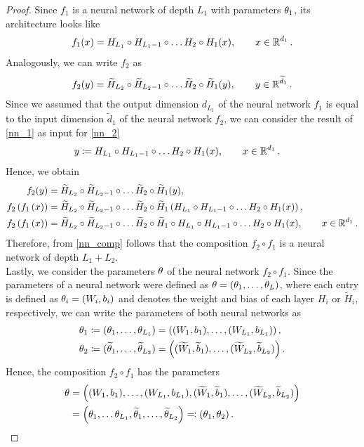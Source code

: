 \begin{proof}
Since $f_1$ is a neural network of depth $L_1$ with parameters $\theta_1$, its architecture looks like
\begin{align}\label{nn_1}
f_1 (x) = H_{L_1} \circ H_{L_1-1} \circ \ldots H_{2} \circ H_1 (x),\qquad x \in \operatorname{\mathbb{R}}^{d_1}.
\end{align}
Analogously, we can write $f_2$ as
\begin{align}\label{nn_2}
f_2 (y) = \widetilde{H}_{L_2} \circ \widetilde{H}_{L_2-1} \circ \ldots \widetilde{H}_{2} \circ \widetilde{H}_1 (y), \qquad y \in \operatorname{\mathbb{R}}^{\widetilde{d}_1}.
\end{align}
Since we assumed that the output dimension $d_{L_1}$ of the neural network $f_1$ is equal to the input dimension $\tilde{d}_1$ of the neural network $f_2$, we can consider the result of \eqref{nn_1} as input for \eqref{nn_2}
\begin{align*}
y &\coloneqq H_{L_1} \circ H_{L_1-1} \circ \ldots H_{2} \circ H_1 (x), \qquad x \in \operatorname{\mathbb{R}}^{d_1}.
\end{align*}
Hence, we obtain
\begin{align}\label{nn_comp}
f_2 (y) &= \widetilde{H}_{L_2} \circ \widetilde{H}_{L_2-1} \circ \ldots \widetilde{H}_{2} \circ \widetilde{H}_1 (y),\nonumber\\
f_2\left(f_1\left(x\right)\right)  &= \widetilde{H}_{L_2} \circ \widetilde{H}_{L_2-1} \circ \ldots \widetilde{H}_{2} \circ \widetilde{H}_1 \left( H_{L_1} \circ H_{L_1-1} \circ \ldots H_{2} \circ H_1 (x) \right),\nonumber\\
f_2\left(f_1\left(x\right)\right)  &= \widetilde{H}_{L_2} \circ \widetilde{H}_{L_2-1} \circ \ldots \widetilde{H}_{2} \circ \widetilde{H}_1 \circ H_{L_1} \circ H_{L_1-1} \circ \ldots H_{2} \circ H_1 (x), \qquad x \in \operatorname{\mathbb{R}}^{d_1}.
\end{align}
Therefore, from \eqref{nn_comp} follows that the composition $f_2 \circ f_1$ is a neural network of depth $L_1 + L_2$.\\
Lastly, we consider the parameters $\theta$ of the neural network $f_2 \circ f_1$. Since the parameters of a neural network were defined as $\theta = (\theta_1,\ldots, \theta_L)$, where each entry is defined as $\theta_i = (W_i, b_i)$ and denotes the weight and bias of each layer $H_i$ or $\tilde{H}_i$, respectively, we can write the parameters of both neural networks as
\begin{align*}
\theta_1 &\coloneqq (\theta_1, \ldots, \theta_{L_1}) = \left((W_1, b_1),\ldots, (W_{L_1}, b_{L_1}) \right),\\
\theta_2 &\coloneqq (\widetilde{\theta}_1, \ldots, \widetilde{\theta}_{L_2}) = \left((\widetilde{W}_1, \widetilde{b}_1),\ldots, (\widetilde{W}_{L_2}, \widetilde{b}_{L_2}) \right).
\end{align*}
Hence, the composition $f_2\circ f_1$ has the parameters
\begin{align*}
\theta  &= \left((W_1, b_1),\ldots, (W_{L_1}, b_{L_1}), (\widetilde{W}_1, \widetilde{b}_1),\ldots, (\widetilde{W}_{L_2}, \widetilde{b}_{L_2})  \right)\\
&= \left(\theta_1,\ldots \theta_{L_1}, \widetilde{\theta}_1, \ldots, \widetilde{\theta}_{L_2} \right) \eqqcolon \left(\theta_1,\theta_2 \right).
\end{align*}
\end{proof}


